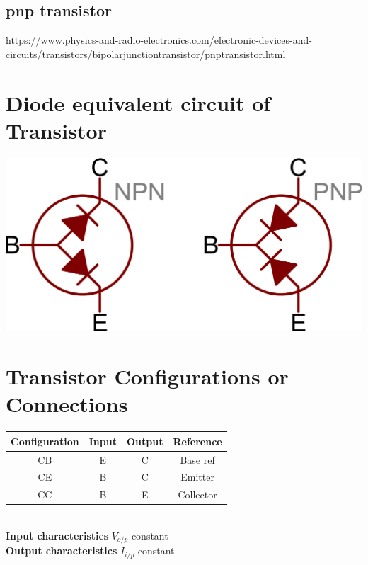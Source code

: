 \documentclass[10pt, a4paper]{report}
\begin{document}
	\subsection{pnp transistor}
	\href{https://www.physics-and-radio-electronics.com/electronic-devices-and-circuits/transistors/bipolarjunctiontransistor/pnptransistor.html}{https://www.physics-and-radio-electronics.com/electronic-devices-and-circuits/transistors/bipolarjunctiontransistor/pnptransistor.html}
	
	\section{Diode equivalent circuit of Transistor}
	\includegraphics[width=0.6\linewidth]{img/transistors diode equivalent}
	\section{Transistor Configurations or Connections}
	\begin{tabular}{|c|c|c|c|}
		\hline
		Configuration & Input & Output & Reference \\
		\hline
		CB & E & C & Base ref \\
		\hline
		CE & B & C & Emitter \\
		\hline
		CC & B & E & Collector \\
		\hline
	\end{tabular} \\
	\textbf{Input characteristics} $ V_{o/p} $ constant\\
	\textbf{Output characteristics} $ I_{i/p} $ constant
	
\end{document}
